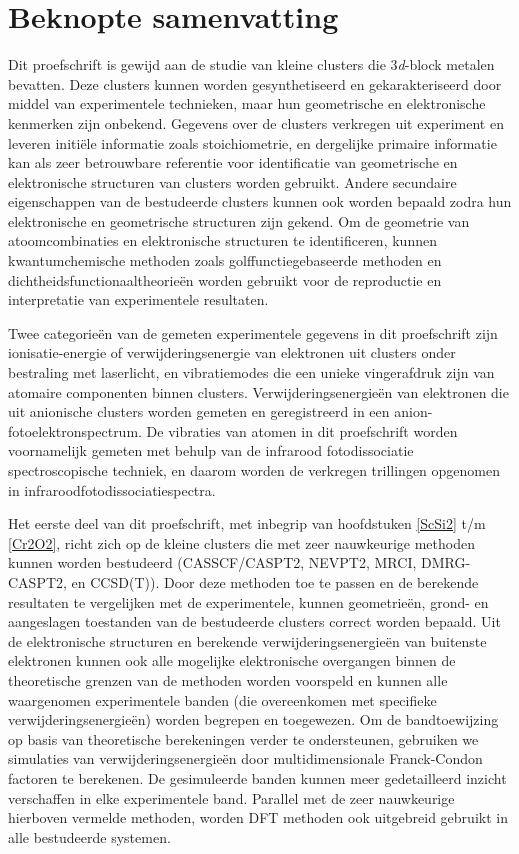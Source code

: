
\chapter{Beknopte samenvatting}

Dit proefschrift is gewijd aan de studie van kleine clusters die 3\textit{d}-block metalen bevatten. Deze clusters kunnen worden gesynthetiseerd en gekarakteriseerd door middel van experimentele technieken, maar hun geometrische en elektronische kenmerken zijn onbekend. Gegevens over de clusters verkregen uit experiment en leveren initiële informatie zoals stoichiometrie, en dergelijke primaire informatie kan als zeer betrouwbare referentie voor identificatie van geometrische en elektronische structuren van clusters worden gebruikt. Andere secundaire eigenschappen van de bestudeerde clusters kunnen ook worden bepaald zodra hun elektronische en geometrische structuren zijn gekend. Om de geometrie van atoomcombinaties en elektronische structuren te identificeren, kunnen kwantumchemische methoden zoals golffunctiegebaseerde methoden en dichtheidsfunctionaaltheorieën worden gebruikt voor de reproductie en interpretatie van experimentele resultaten. 


Twee categorieën van de gemeten experimentele gegevens in dit proefschrift zijn ionisatie-energie of verwijderingsenergie van elektronen uit clusters onder bestraling met laserlicht, en vibratiemodes die een unieke vingerafdruk zijn van atomaire componenten binnen clusters. Verwijderingsenergieën van elektronen die uit anionische clusters worden gemeten en geregistreerd in een anion-fotoelektronspectrum. De vibraties van atomen in dit proefschrift worden voornamelijk gemeten met behulp van de infrarood fotodissociatie spectroscopische techniek, en daarom worden de verkregen trillingen opgenomen in infraroodfotodissociatiespectra.



Het eerste deel van dit proefschrift, met inbegrip van hoofdstuken \ref{ScSi2} t/m \ref{Cr2O2}, richt zich op de kleine clusters die met zeer nauwkeurige methoden kunnen worden bestudeerd (CASSCF/CASPT2, NEVPT2, MRCI, DMRG-CASPT2, en CCSD(T)). Door deze methoden toe te passen en de berekende resultaten te vergelijken met de experimentele, kunnen geometrieën, grond- en aangeslagen toestanden van de bestudeerde clusters correct worden bepaald. Uit de elektronische structuren en berekende verwijderingsenergieën van buitenste elektronen kunnen ook alle mogelijke elektronische overgangen binnen de theoretische grenzen van de methoden worden voorspeld en kunnen alle waargenomen experimentele banden (die overeenkomen met specifieke verwijderingsenergieën) worden begrepen en toegewezen. Om de bandtoewijzing op basis van theoretische berekeningen verder te ondersteunen, gebruiken we simulaties van verwijderingsenergieën door multidimensionale Franck-Condon factoren te berekenen. De gesimuleerde banden kunnen meer gedetailleerd inzicht verschaffen in elke experimentele band. Parallel met de zeer nauwkeurige hierboven vermelde methoden, worden DFT methoden ook uitgebreid gebruikt in alle bestudeerde systemen. 


